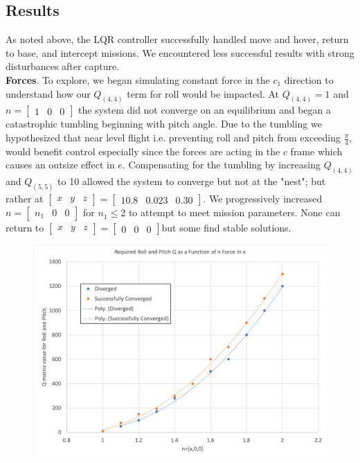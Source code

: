 \documentclass{article}
\begin{document}
\begin{multicols}{2}
\section*{Results}
As noted above, the LQR controller successfully handled move and hover, return to base, and intercept missions.  We encountered less successful results with strong disturbances after capture.\\
\textbf{Forces}.  To explore, we began simulating constant force in the $c_1$ direction to understand how our $Q_{(4,4)}$ term for roll would be impacted.  At $Q_{(4,4)}=1$ and $n=\begin{bmatrix}1 & 0 & 0\end{bmatrix}$ the system did not converge on an equilibrium and began a catastrophic tumbling beginning with pitch angle. Due to the tumbling we hypothesized that near level flight i.e. preventing roll and pitch from exceeding $\frac{\pi}{4}$, would benefit control especially since the forces are acting in the $c$ frame which causes an outsize effect in $e$.  Compensating for the tumbling by increasing $Q_{(4,4)}$ and $Q_{(5,5)}$ to 10 allowed the system to converge but not at the "nest"; but rather at $\begin{bmatrix}x & y & z\end{bmatrix}=\begin{bmatrix}10.8 & 0.023 & 0.30\end{bmatrix}$.  We progressively increased $n=\begin{bmatrix}n_1 & 0 & 0\end{bmatrix}$ for $n_1\leq2$ to attempt to meet mission parameters.  None can return to  $\begin{bmatrix}x & y & z\end{bmatrix}=\begin{bmatrix}0 & 0 & 0\end{bmatrix}$but some find stable solutions.  
\begin{figure}[H]
\centering
    \includegraphics[width = 1\columnwidth]{images/RollPitch.png}

\end{figure}
\end{multicols}
\end{document}

